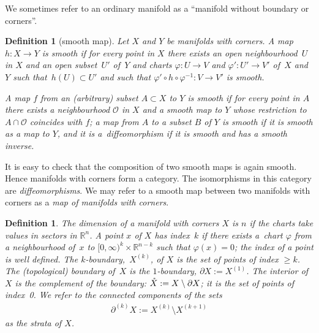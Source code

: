 \documentclass[pdftex]{sigma}
\numberwithin{equation}{section}
\newtheorem{Definition}[Lemma]{Definition}
\begin{document}
We sometimes refer to an ordinary manifold as a ``manifold
without boundary or corners''.

\begin{Definition}[smooth map]
Let $X$ and $Y$ be manifolds with corners.
A map $h \colon X \to Y$ is \emph{smooth}
if for every point in $X$ there exists an open neighbourhood~$U$ in $X$
and an open subset~$U'$ of~$Y$
and charts $\varphi \colon U \to V$ and $\varphi' \colon U' \to V'$
of~$X$ and~ $Y$
such that~$h(U) \subset U'$
and such that $\varphi' \circ h \circ \varphi^{-1} \colon V \to V'$ is smooth.

A map $f$ from an (arbitrary) subset $A \subset X$ to $Y$ is smooth
if for every point in $A$ there exists a neighbourhood ${\mathcal O}$ in $X$
and a smooth map to $Y$ whose restriction to $A \cap {\mathcal O}$ coincides
with $f$; a map from $A$ to a subset $B$ of $Y$ is smooth if it is smooth
as a map to $Y$, and it is a~\emph{diffeomorphism} if it is smooth and has
a smooth inverse.
\end{Definition}

It is easy to check that the composition of two smooth maps is again smooth.
Hence manifolds with corners form a category.
The isomorphisms in this category are \emph{diffeomorphisms}.
We may refer to a smooth map between two manifolds with corners
as a {\em map of manifolds with corners}.

\begin{Definition} \label{strata} The \emph{dimension} of a manifold
  with corners $X$ is $n$ if the charts take values in sectors in
  ${\mathbb R}^n$.  A point $x$ of $X$ has \emph{index~$k$} if there exists a~chart $\varphi$ from a neighbourhood of~$x$ to $[0,\infty)^k \times
  {\mathbb R}^{n-k}$ such that $\varphi(x) = 0$; the index of a point is well
  def\/ined.  The \emph{$k$-boundary},~$X^{(k)}$, of $X$ is the set of
  points of index $\geq k$.  The (topological) \emph{boundary} of~$X$ is the
  $1$-boundary, $\partial X := X^{(1)}$.  The \emph{interior} of~$X$ is
  the complement of the boundary: ${\mathaccent23{X}} := X \setminus \partial X$; it is
  the set of points of index~0.
We refer to the connected components of the sets
\begin{gather*}
\partial^{(k)}X:= X^{(k)} \setminus X^{(k+1)}
\end{gather*}
 as the \emph{strata} of $X$.
\end{Definition}
\end{document}
